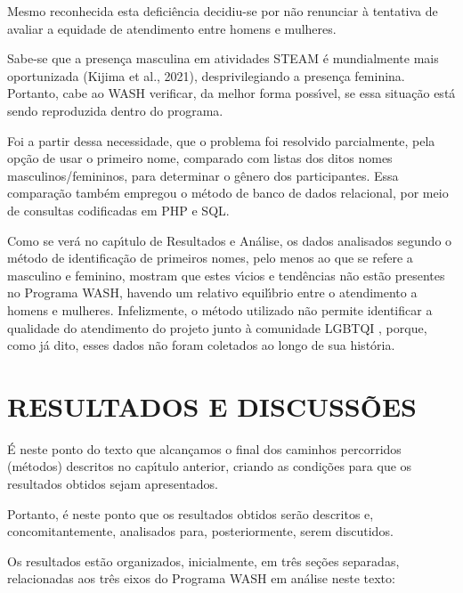 \documentclass[
12pt,		%
openright,	%
twoside,  %
a4paper,			%
chapter=TITLE,		%
english,			%
french,				%
spanish,			%
brazil				%
]{USPSC-classe/USPSC}
\begin{document}
Mesmo reconhecida esta defici\^encia decidiu-se por n\~ao renunciar \`a tentativa de avaliar a equidade de atendimento entre homens e mulheres.




Sabe-se que a presen\c{c}a masculina em atividades STEAM \'e mundialmente mais oportunizada  (Kijima et al., 2021),  desprivilegiando a presen\c{c}a feminina. Portanto, cabe ao WASH verificar, da melhor forma poss\'{\i}vel, se essa situa\c{c}\~ao est\'a sendo reproduzida dentro do programa.




Foi a partir dessa necessidade, que o problema foi resolvido parcialmente, pela op\c{c}\~ao de usar o primeiro nome, comparado com listas dos ditos nomes masculinos/femininos, para determinar o g\^enero dos participantes. Essa compara\c{c}\~ao tamb\'em empregou o m\'etodo de banco de dados relacional, por meio de consultas codificadas em PHP e SQL.




Como se ver\'a no cap\'{\i}tulo de Resultados e An\'alise, os dados analisados segundo o m\'etodo de identifica\c{c}\~ao de primeiros nomes, pelo menos ao que se refere a masculino e feminino, mostram que estes v\'{\i}cios e tend\^encias n\~ao est\~ao presentes no Programa WASH, havendo um relativo equil\'{\i}brio entre o atendimento a homens e mulheres. Infelizmente, o m\'etodo utilizado n\~ao permite identificar a qualidade do atendimento do projeto junto \`a comunidade LGBTQI , porque, como j\'a dito, esses dados n\~ao foram coletados ao longo de sua hist\'oria.




\chapter[RESULTADOS E DISCUSS\~OES]{RESULTADOS E DISCUSS\~OES}\label{RESULTADOS E DISCUSS\~OES}
\'E neste ponto do texto que alcan\c{c}amos o final dos caminhos percorridos (m\'etodos) descritos no cap\'{\i}tulo anterior, criando as condi\c{c}\~oes para que os resultados obtidos sejam apresentados.




Portanto, \'e neste ponto que os resultados obtidos ser\~ao descritos e, concomitantemente, analisados para, posteriormente, serem discutidos.




Os resultados est\~ao organizados, inicialmente, em tr\^es se\c{c}\~oes separadas, relacionadas aos tr\^es eixos do Programa WASH em an\'alise neste texto:
\end{document}
